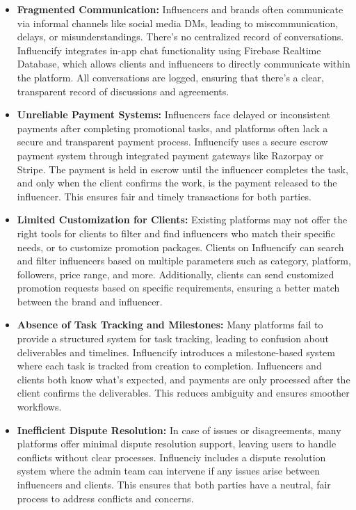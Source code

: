\begin{justify}
\begin{itemize}
    \item \textbf{Fragmented Communication:}
    Influencers and brands often communicate via informal channels like social media DMs, leading to miscommunication, delays, or misunderstandings. There’s no centralized record of conversations.
    Influencify integrates in-app chat functionality using Firebase Realtime Database, which allows clients and influencers to directly communicate within the platform. All conversations are logged, ensuring that there’s a clear, transparent record of discussions and agreements.

    \item \textbf{Unreliable Payment Systems:}
    Influencers face delayed or inconsistent payments after completing promotional tasks, and platforms often lack a secure and transparent payment process.
    Influencify uses a secure escrow payment system through integrated payment gateways like Razorpay or Stripe. The payment is held in escrow until the influencer completes the task, and only when the client confirms the work, is the payment released to the influencer. This ensures fair and timely transactions for both parties.

    \item \textbf{Limited Customization for Clients:}
    Existing platforms may not offer the right tools for clients to filter and find influencers who match their specific needs, or to customize promotion packages.
    Clients on Influencify can search and filter influencers based on multiple parameters such as category, platform, followers, price range, and more. Additionally, clients can send customized promotion requests based on specific requirements, ensuring a better match between the brand and influencer.

    \item \textbf{Absence of Task Tracking and Milestones:}
    Many platforms fail to provide a structured system for task tracking, leading to confusion about deliverables and timelines.
    Influencify introduces a milestone-based system where each task is tracked from creation to completion. Influencers and clients both know what’s expected, and payments are only processed after the client confirms the deliverables. This reduces ambiguity and ensures smoother workflows.

    \item \textbf{Inefficient Dispute Resolution:}
    In case of issues or disagreements, many platforms offer minimal dispute resolution support, leaving users to handle conflicts without clear processes.
    Influenciy includes a dispute resolution system where the admin team can intervene if any issues arise between influencers and clients. This ensures that both parties have a neutral, fair process to address conflicts and concerns.


\end{itemize}
\end{justify}
